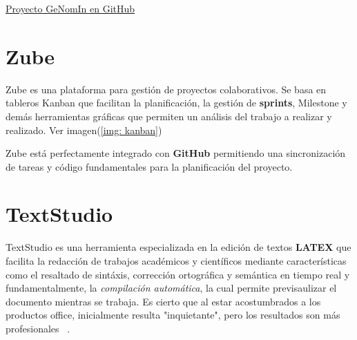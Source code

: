 \href{https://github.com/far0010/TFGUBU-Fran_Arroyo}{Proyecto GeNomIn en GitHub}

\section{Zube}
Zube es una plataforma para gestión de proyectos colaborativos. Se basa en tableros \gls{Kanban} que facilitan la planificación, la gestión de \textbf{sprints}, \gls{Milestone} y demás herramientas gráficas que permiten un análisis del trabajo a realizar y realizado. Ver imagen(\ref{img: kanban})

Zube está perfectamente integrado con \textbf{GitHub} permitiendo una sincronización de tareas y código fundamentales para la planificación del proyecto.

\section{TextStudio}

TextStudio es una herramienta especializada en la edición de textos \textbf{\gls{LATEX}} que facilita la redacción de trabajos académicos y científicos mediante características como el resaltado de sintáxis, corrección ortográfica y semántica en tiempo real y fundamentalmente, la \textit{compilación automática}, la cual permite previsaulizar el documento mientras se trabaja. 
Es cierto que al estar acostumbrados a los productos office, inicialmente resulta "inquietante", pero los resultados son más profesionales ~\cite{BibliotecaComplutenseLaTeXTuTFG2024}.
